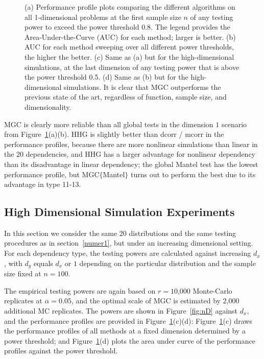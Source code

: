 \documentclass[11pt]{article}
\begin{document}
\begin{figure}[htbp]
{(a) Performance profile plots comparing the different algorithms on all 1-dimensional problems at the first sample size $n$ of any testing power to exceed the power threshold 0.8. The legend provides the Area-Under-the-Curve (AUC) for each method; larger is better.
(b) AUC for each method sweeping over all different power thresholds, the higher the better.
(c) Same as (a) but for the high-dimensional simulations, at the last dimension of any testing power that is above the power threshold 0.5.
(d) Same as (b) but for the high-dimensional simulations.
It is clear that MGC outperforms the previous state of the art, regardless of function, sample size, and dimensionality.}
\label{fig:pp}
\end{figure}

MGC is clearly more reliable than all global tests in the dimension $1$ scenario from Figure~\ref{fig:pp}(a)(b). HHG is slightly better than dcorr / mcorr in the performance profiles, because there are more nonlinear simulations than linear in the $20$ dependencies, and HHG has a larger advantage for nonlinear dependency than its disadvantage in linear dependency; the global Mantel test has the lowest performance profile, but MGC$\{$Mantel$\}$ turns out to perform the best due to its advantage in type 11-13. 



\subsection{High Dimensional Simulation Experiments}
\label{numer2}
In this section we consider the same $20$ distributions and the same testing procedures as in section~\ref{numer1}, but under an increasing dimensional setting. For each dependency type, the testing powers are calculated against increasing $d_{x}$, with $d_{y}$ equals $d_{x}$ or $1$ depending on the particular distribution and the sample size fixed at $n=100$.

The empirical testing powers are again based on $r=10$,$000$ Monte-Carlo replicates at $\alpha=0.05$, and the optimal scale of MGC is estimated by $2$,$000$ additional MC replicates. The powers are shown in Figure~\ref{fig:nD} against $d_{x}$, and the performance profiles are provided in Figure~\ref{fig:pp}(c)(d): Figure~\ref{fig:pp}(c) draws the performance profiles of all methods at a fixed dimension determined by a power threshold; and Figure~\ref{fig:pp}(d) plots the area under curve of the performance profiles against the power threshold.
\end{document}
